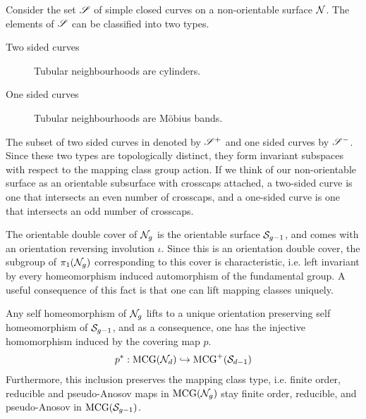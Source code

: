 \documentclass[12pt, reqno]{amsart}
\begin{document}
Consider the set $\mathscr{S}$ of simple closed curves on a non-orientable surface $\mathcal{N}$.
The elements of $\mathscr{S}$ can be classified into two types.
\begin{description}
\item[Two sided curves] Tubular neighbourhoods are cylinders.
\item[One sided curves] Tubular neighbourhoods are Möbius bands.
\end{description}
The subset of two sided curves in denoted by $\mathscr{S}^+$ and one sided curves by $\mathscr{S}^-$.
Since these two types are topologically distinct, they form invariant subspaces with respect to the mapping class group action.
If we think of our non-orientable surface as an orientable subsurface with crosscaps attached, a two-sided curve is one that intersects an even number of crosscaps, and a one-sided curve is one that intersects an odd number of crosscaps.

The orientable double cover of $\mathcal{N}_g$ is the orientable surface $\mathcal{S}_{g-1}$, and comes with an orientation reversing involution $\iota$.
Since this is an orientation double cover, the subgroup of $\pi_1(\mathcal{N}_g)$ corresponding to this cover is characteristic, i.e. left invariant by every homeomorphism induced automorphism of the fundamental group.
A useful consequence of this fact is that one can lift mapping classes uniquely.
\begin{fact}
  Any self homeomorphism of $\mathcal{N}_g$ lifts to a unique orientation preserving self homeomorphism of $\mathcal{S}_{g-1}$, and as a consequence, one has the injective homomorphism induced by the covering map $p$.
  \begin{align*}
    p^{\ast}: \mathrm{MCG}(\mathcal{N}_d) \hookrightarrow \mathrm{MCG}^+(\mathcal{S}_{d-1})
  \end{align*}
  Furthermore, this inclusion preserves the mapping class type, i.e. finite order, reducible and pseudo-Anosov maps in $\mathrm{MCG}(\mathcal{N}_g)$ stay finite order, reducible, and pseudo-Anosov in $\mathrm{MCG}(\mathcal{S}_{g-1})$.
\end{fact}
\end{document}
